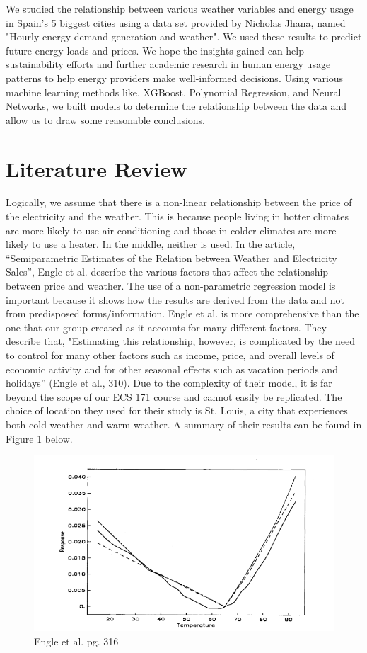 \documentclass[10pt]{article}
\begin{document}
We studied the relationship between various weather variables and energy usage in Spain's 5 biggest cities using a data set provided by Nicholas Jhana, named "Hourly energy demand generation and weather". We used these results to predict future energy loads and prices. We hope the insights gained can  help sustainability efforts and further academic research in human energy usage patterns to help energy providers make well-informed decisions. Using various machine learning methods like, XGBoost, Polynomial Regression, and Neural Networks, we built models to determine the relationship between the data and allow us to draw some reasonable conclusions.

\section{Literature Review}\label{sec:2}
Logically, we assume that there is a non-linear relationship between the price of the electricity and the weather. This is because people living in hotter climates are more likely to use air conditioning and those in colder climates are more likely to use a heater. In the middle, neither is used. In the article, “Semiparametric Estimates of the Relation between Weather and Electricity Sales”, Engle et al. describe the various factors that affect the relationship between price and weather. The use of a non-parametric regression model is important because it shows how the results are derived from the data and not from predisposed forms/information. Engle et al. is more comprehensive than the one that our group created as it accounts for many different factors. They describe that, "Estimating this relationship, however, is complicated by the need to control for many other factors such as income, price, and overall levels of economic activity and for other seasonal effects such as vacation periods and holidays” (Engle et al., 310). Due to the complexity of their model, it is far beyond the scope of our ECS 171 course and cannot easily be replicated. The choice of location they used for their study is St. Louis, a city that experiences both cold weather and warm weather. A summary of their results can be found in Figure 1 below.

\begin{figure}[H]
    \centering
    \includegraphics[scale=0.68]{graph1.png}
    \caption{Engle et al. pg. 316}
    \label{LitReviewImage1}
\end{figure}
\end{document}
